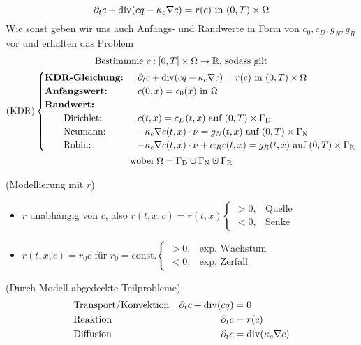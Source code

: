 \[ \partial_t c + \operatorname{div}(c q - \kappa_c \nabla c) = r(c) \text{ in } (0,T) \times \Omega \]
Wie sonst geben wir uns auch Anfangs- und Randwerte in Form von $ c_0, c_D, g_N, g_R $vor und erhalten das Problem
\begin{gather*}
	\text{Bestimmme } c:[0,T] \times \Omega \to \R \text{, sodass gilt}\\
	\KDR \begin{cases}
		\text{\textbf{KDR-Gleichung: }}&\partial_t c + \dive(c q - \kappa_c \nabla c) = r(c) \text{ in } (0,T) \times \Omega\\
		\text{\textbf{Anfangswert: }} &c(0,x) = c_0(x) \text{ in } \Omega\\
		\text{\textbf{Randwert:}}\\
		\qquad \text{Dirichlet: } &c(t,x) = c_D(t,x) \text{ auf } (0,T) \times \GammaD \\
		\qquad \text{Neumann: } &-\kappa_c \nabla c(t,x) \cdot \nu = g_N(t,x) \text{ auf } (0,T) \times \GammaN \\
		\qquad \text{Robin: } &-\kappa_c \nabla c(t,x) \cdot \nu + \alpha_R c(t,x) = g_R(t,x) \text{ auf } (0,T) \times \GammaR
	\end{cases}\\
	\text{wobei } \Omega = \GammaD \cupdot \GammaN \cupdot \GammaR
\end{gather*}

\begin{remark}
	(Modellierung mit $ r $)
	\begin{itemize}
		\item $ r $ unabhängig von $ c $, also $ r(t,x,c) = r(t,x) \begin{cases}
		> 0, &\text{Quelle}\\
		< 0, &\text{Senke}
		\end{cases} $
		\item $ r(t,x,c) = r_0 c $ für $ r_0 = \text{const.} \begin{cases}
		> 0, &\text{exp. Wachstum}\\
		< 0, &\text{exp. Zerfall}
		\end{cases} $
	\end{itemize}
\end{remark}

\begin{remark}
	(Durch Modell abgedeckte Teilprobleme)
	\begin{align*}
	&\text{Transport/Konvektion} & \partial_t c + \operatorname{div}(cq) &= 0\\
	&\text{Reaktion} & \partial_t c &= r(c)\\
	&\text{Diffusion} & \partial_t c &= \operatorname{div}(\kappa_c \nabla c)
	\end{align*}
\end{remark}

